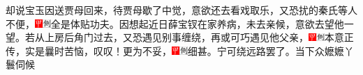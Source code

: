 却说宝玉因送贾母回来，待贾母歇了中觉，意欲还去看戏取乐，又恐扰的秦氏等人不便，{\includegraphics[width=3mm]{../Images/00002}\includegraphics[width=3mm]{../Images/00011}\footnotesize \kaishu 全是体贴功夫。}因想起近日薛宝钗在家养病，未去亲候，意欲去望他一望。若从上房后角门过去，又恐遇见别事缠绕，再或可巧遇见他父亲，{\includegraphics[width=3mm]{../Images/00002}\includegraphics[width=3mm]{../Images/00011}\footnotesize \kaishu 本意正传，实是曩时苦恼，叹叹！}更为不妥，{\includegraphics[width=3mm]{../Images/00002}\includegraphics[width=3mm]{../Images/00011}\footnotesize \kaishu 细甚。}宁可绕远路罢了。当下众嬷嬷丫鬟伺候